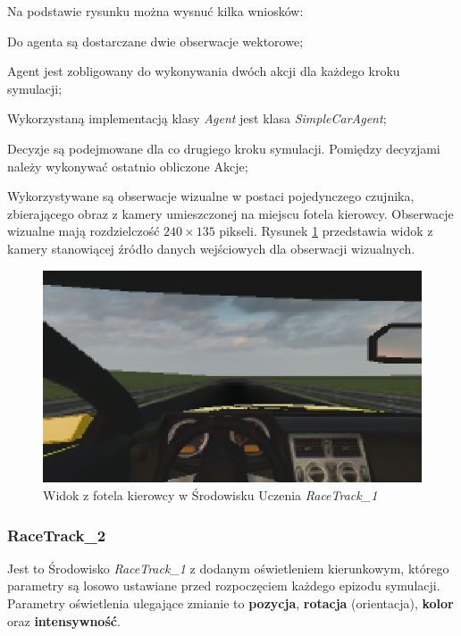 \noindent
Na podstawie rysunku można wysnuć kilka wniosków:
\vspace{-0.5cm}
\begin{itemize*}
\item Do agenta są dostarczane dwie obserwacje wektorowe;
\item Agent jest zobligowany do wykonywania dwóch akcji dla każdego kroku symulacji;
\item Wykorzystaną implementacją klasy \textit{Agent} jest klasa \textit{SimpleCarAgent};
\item Decyzje są podejmowane dla co drugiego kroku symulacji. Pomiędzy decyzjami należy wykonywać ostatnio obliczone Akcje;
\item Wykorzystywane są obserwacje wizualne w postaci pojedynczego czujnika, zbierającego obraz z kamery umieszczonej na miejscu fotela kierowcy. Obserwacje wizualne mają rozdzielczość $240 \times 135$ pikseli. Rysunek \ref{RaceTrack1Cockpit} przedstawia widok z kamery stanowiącej źródło danych wejściowych dla obserwacji wizualnych.
\end{itemize*}

\begin{figure}[h]
\begin{center}
\includegraphics[width=15cm]{resources/figures/race_track_1_cockpit.png}
\caption{Widok z fotela kierowcy w Środowisku Uczenia \textit{RaceTrack\_1}}
\label{RaceTrack1Cockpit}
\end{center}
\vspace*{-1cm}
\end{figure}

\subsubsection{RaceTrack\_2}
Jest to Środowisko \textit{RaceTrack\_1} z dodanym oświetleniem kierunkowym, którego parametry są losowo ustawiane przed rozpoczęciem każdego epizodu symulacji. Parametry oświetlenia ulegające zmianie to \textbf{pozycja}, \textbf{rotacja} (orientacja), \textbf{kolor} oraz \textbf{intensywność}.

